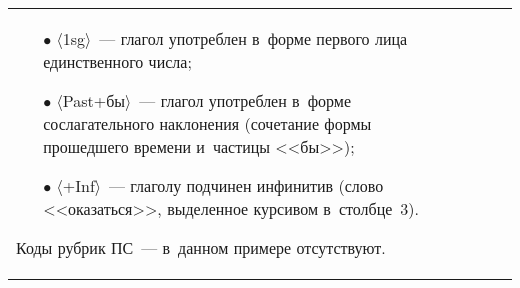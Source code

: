 \begin{table*}
\begin{center}
\begin{tabular}{|p{42mm}|p{23mm}|p{55mm}|p{21mm}|}
{\begin{itemize}
\begin{itemize}
\item[$\bullet$] $\langle$1sg$\rangle$~---  глагол употреблен в~форме первого лица 
единственного числа;\vspace*{-4pt}
\item[$\bullet$] $\langle$Past+бы$\rangle$~---  глагол употреблен в~форме 
сослагательного наклонения (сочетание формы прошедшего времени и~частицы 
<<бы>>);\vspace*{-4pt}
\item[$\bullet$] $\langle$+Inf$\rangle$~---  глаголу подчинен инфинитив (слово 
<<оказаться>>, выделенное курсивом в~столб\-це~3).\vspace*{-4pt}
\end{itemize}
\end{itemize}
Коды рубрик ПС~--- в~данном примере отсутствуют.}
\end{tabular}
\end{center}
\vspace*{-9pt}
\end{table*}


